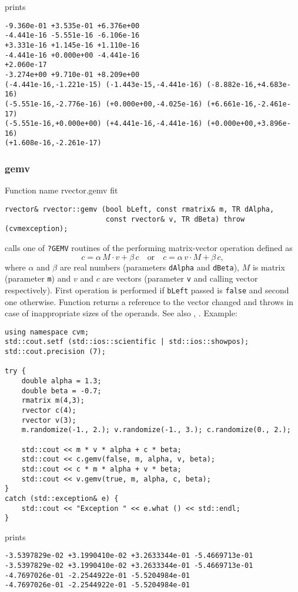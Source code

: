 prints
\begin{Verbatim}
-9.360e-01 +3.535e-01 +6.376e+00
-4.441e-16 -5.551e-16 -6.106e-16
+3.331e-16 +1.145e-16 +1.110e-16
-4.441e-16 +0.000e+00 -4.441e-16
+2.060e-17
-3.274e+00 +9.710e-01 +8.209e+00
(-4.441e-16,-1.221e-15) (-1.443e-15,-4.441e-16) (-8.882e-16,+4.683e-16)
(-5.551e-16,-2.776e-16) (+0.000e+00,-4.025e-16) (+6.661e-16,-2.461e-17)
(-5.551e-16,+0.000e+00) (+4.441e-16,-4.441e-16) (+0.000e+00,+3.896e-16)
(+1.608e-16,-2.261e-17)
\end{Verbatim}
\newpage


\subsubsection{gemv}
Function%
\pdfdest name {rvector.gemv} fit
\begin{verbatim}
rvector& rvector::gemv (bool bLeft, const rmatrix& m, TR dAlpha,
                        const rvector& v, TR dBeta) throw (cvmexception);
\end{verbatim}
calls one of \verb"?GEMV" routines of the
performing matrix-vector operation defined as
\begin{equation*}
c=\alpha\,M\cdot v + \beta\,c\quad\text{or}\quad c=\alpha\,v\cdot M + \beta\, c,
\end{equation*}
where $\alpha$ and $\beta$ are real numbers 
(parameters \verb"dAlpha" and \verb"dBeta"),
$M$ is  matrix (parameter \verb"m")
and $v$ and $c$ are vectors (parameter \verb"v"
and calling vector respectively).
First operation is performed if \verb"bLeft" passed
is \verb"false" and second one otherwise.
Function
returns a reference to the vector changed and throws
in case of inappropriate sizes of the operands.
See also
,
.
Example:
\begin{Verbatim}
using namespace cvm;
std::cout.setf (std::ios::scientific | std::ios::showpos);
std::cout.precision (7);

try {
    double alpha = 1.3;
    double beta = -0.7;
    rmatrix m(4,3);
    rvector c(4);
    rvector v(3);
    m.randomize(-1., 2.); v.randomize(-1., 3.); c.randomize(0., 2.);

    std::cout << m * v * alpha + c * beta;
    std::cout << c.gemv(false, m, alpha, v, beta);
    std::cout << c * m * alpha + v * beta;
    std::cout << v.gemv(true, m, alpha, c, beta);
}
catch (std::exception& e) {
    std::cout << "Exception " << e.what () << std::endl;
}
\end{Verbatim}
prints
\begin{Verbatim}
-3.5397829e-02 +3.1990410e-02 +3.2633344e-01 -5.4669713e-01
-3.5397829e-02 +3.1990410e-02 +3.2633344e-01 -5.4669713e-01
-4.7697026e-01 -2.2544922e-01 -5.5204984e-01
-4.7697026e-01 -2.2544922e-01 -5.5204984e-01
\end{Verbatim}
\newpage



